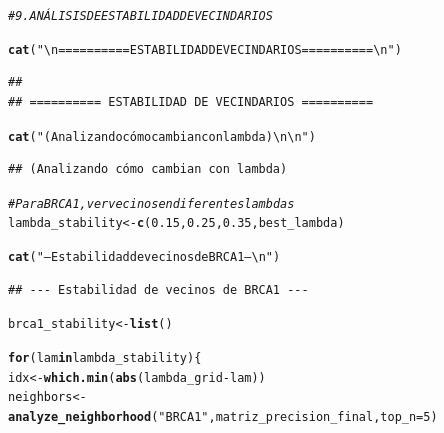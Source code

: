 \documentclass{article}\usepackage[]{graphicx}\usepackage[]{xcolor}
\makeatletter
\newcommand{\hlnum}[1]{\textcolor[rgb]{0.686,0.059,0.569}{#1}}%
\newcommand{\hlsng}[1]{\textcolor[rgb]{0.192,0.494,0.8}{#1}}%
\newcommand{\hlcom}[1]{\textcolor[rgb]{0.678,0.584,0.686}{\textit{#1}}}%
\newcommand{\hlopt}[1]{\textcolor[rgb]{0,0,0}{#1}}%
\newcommand{\hldef}[1]{\textcolor[rgb]{0.345,0.345,0.345}{#1}}%
\newcommand{\hlkwa}[1]{\textcolor[rgb]{0.161,0.373,0.58}{\textbf{#1}}}%
\newcommand{\hlkwb}[1]{\textcolor[rgb]{0.69,0.353,0.396}{#1}}%
\newcommand{\hlkwc}[1]{\textcolor[rgb]{0.333,0.667,0.333}{#1}}%
\newcommand{\hlkwd}[1]{\textcolor[rgb]{0.737,0.353,0.396}{\textbf{#1}}}%
\newenvironment{kframe}{%
 \def\at@end@of@kframe{}%
 \ifinner\ifhmode%
  \def\at@end@of@kframe{\end{minipage}}%
  \begin{minipage}{\columnwidth}%
 \fi\fi%
 \def\FrameCommand##1{\hskip\@totalleftmargin \hskip-\fboxsep
 \colorbox{shadecolor}{##1}\hskip-\fboxsep
     \hskip-\linewidth \hskip-\@totalleftmargin \hskip\columnwidth}%
 \MakeFramed {\advance\hsize-\width
   \@totalleftmargin\z@ \linewidth\hsize
   \@setminipage}}%
 {\par\unskip\endMakeFramed%
 \at@end@of@kframe}
\newenvironment{knitrout}{}{} %
\makeatother
\begin{document}
\begin{knitrout}
\color{fgcolor}\begin{kframe}
\begin{alltt}
\hlcom{# 9. ANÁLISIS DE ESTABILIDAD DE VECINDARIOS}
\end{alltt}
\end{kframe}
\end{knitrout}
\begin{knitrout}
\color{fgcolor}\begin{kframe}
\begin{alltt}
\hlkwd{cat}\hldef{(}\hlsng{"\textbackslash{}n========== ESTABILIDAD DE VECINDARIOS ==========\textbackslash{}n"}\hldef{)}
\end{alltt}
\begin{verbatim}
## 
## ========== ESTABILIDAD DE VECINDARIOS ==========
\end{verbatim}
\begin{alltt}
\hlkwd{cat}\hldef{(}\hlsng{"(Analizando cómo cambian con lambda)\textbackslash{}n\textbackslash{}n"}\hldef{)}
\end{alltt}
\begin{verbatim}
## (Analizando cómo cambian con lambda)
\end{verbatim}
\begin{alltt}
\hlcom{# Para BRCA1, ver vecinos en diferentes lambdas}
\hldef{lambda_stability} \hlkwb{<-} \hlkwd{c}\hldef{(}\hlnum{0.15}\hldef{,} \hlnum{0.25}\hldef{,} \hlnum{0.35}\hldef{, best_lambda)}

\hlkwd{cat}\hldef{(}\hlsng{"--- Estabilidad de vecinos de BRCA1 ---\textbackslash{}n"}\hldef{)}
\end{alltt}
\begin{verbatim}
## --- Estabilidad de vecinos de BRCA1 ---
\end{verbatim}
\begin{alltt}
\hldef{brca1_stability} \hlkwb{<-} \hlkwd{list}\hldef{()}

\hlkwa{for}\hldef{(lam} \hlkwa{in} \hldef{lambda_stability) \{}
  \hldef{idx} \hlkwb{<-} \hlkwd{which.min}\hldef{(}\hlkwd{abs}\hldef{(lambda_grid} \hlopt{-} \hldef{lam))}
  \hldef{neighbors} \hlkwb{<-} \hlkwd{analyze_neighborhood}\hldef{(}\hlsng{"BRCA1"}\hldef{, matriz_precision_final,} \hlkwc{top_n}\hldef{=}\hlnum{5}\hldef{)}


\end{alltt}
\end{kframe}
\end{knitrout}
\end{document}
